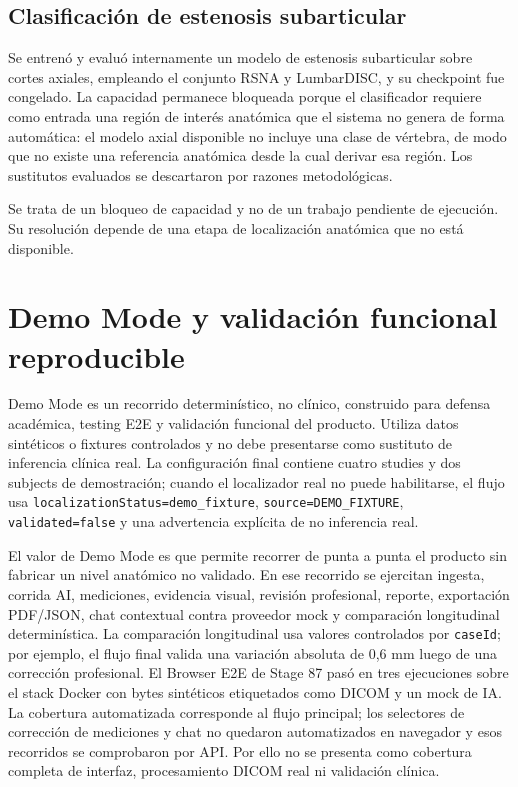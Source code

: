 \subsection{Clasificación de estenosis subarticular}

Se entrenó y evaluó internamente un modelo de estenosis subarticular sobre cortes axiales, empleando el conjunto RSNA y LumbarDISC, y su checkpoint fue congelado. La capacidad permanece bloqueada porque el clasificador requiere como entrada una región de interés anatómica que el sistema no genera de forma automática: el modelo axial disponible no incluye una clase de vértebra, de modo que no existe una referencia anatómica desde la cual derivar esa región. Los sustitutos evaluados se descartaron por razones metodológicas.

Se trata de un bloqueo de capacidad y no de un trabajo pendiente de ejecución. Su resolución depende de una etapa de localización anatómica que no está disponible.


\section{Demo Mode y validación funcional reproducible}
\label{sec:cap-demo-mode}

Demo Mode es un recorrido determinístico, no clínico, construido para defensa académica, testing E2E y validación funcional del producto. Utiliza datos sintéticos o fixtures controlados y no debe presentarse como sustituto de inferencia clínica real. La configuración final contiene cuatro studies y dos subjects de demostración; cuando el localizador real no puede habilitarse, el flujo usa \texttt{localizationStatus=demo\_fixture}, \texttt{source=DEMO\_FIXTURE}, \texttt{validated=false} y una advertencia explícita de no inferencia real.

El valor de Demo Mode es que permite recorrer de punta a punta el producto sin fabricar un nivel anatómico no validado. En ese recorrido se ejercitan ingesta, corrida AI, mediciones, evidencia visual, revisión profesional, reporte, exportación PDF/JSON, chat contextual contra proveedor mock y comparación longitudinal determinística. La comparación longitudinal usa valores controlados por \texttt{caseId}; por ejemplo, el flujo final valida una variación absoluta de 0,6 mm luego de una corrección profesional. El Browser E2E de Stage 87 pasó en tres ejecuciones sobre el stack Docker con bytes sintéticos etiquetados como DICOM y un mock de IA. La cobertura automatizada corresponde al flujo principal; los selectores de corrección de mediciones y chat no quedaron automatizados en navegador y esos recorridos se comprobaron por API. Por ello no se presenta como cobertura completa de interfaz, procesamiento DICOM real ni validación clínica.

